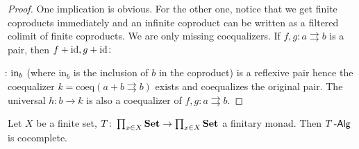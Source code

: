 \documentclass[a4paper,11pt,oneside,openany]{scrbook}
\begin{document}
\begin{proof}
	One implication is obvious. For the other one, notice that we get finite coproducts immediately and an infinite coproduct can be written as a filtered colimit of finite coproducts. We are only missing coequalizers. If $f,g\colon a\rightrightarrows b$ is a pair, then $f+\operatorname{id},g+\operatorname{id}\colon\hspace{-1.5mm}$$\hspace{-1.5mm}\colon\text{in}_b$ (where in$_b$ is the inclusion of $b$ in the coproduct) is a reflexive pair hence the coequalizer $k=\text{coeq}(a+b\rightrightarrows b)$ exists and coequalizes the original pair. The universal $h\colon b\rightarrow k$ is also a coequalizer of $f,g\colon a\rightrightarrows b$.
\end{proof}
\begin{thm}
	Let $X$ be a finite set, $T\colon\prod_{x\in X}{\normalfont\textbf{Set}}\to\prod_{x\in X}{\normalfont\textbf{Set}}$ a finitary monad. Then $T\operatorname{-\mathsf{Alg}}$ is cocomplete.
\end{thm}
\end{document}
